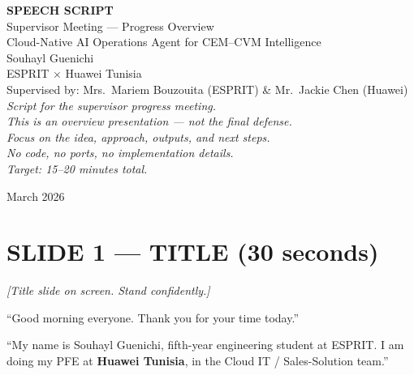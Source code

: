 \documentclass[12pt,a4paper]{article}
\newcommand{\stage}[1]{\par\textit{\color{stagedir}[#1]}\par}
\newcommand{\beat}{\par\vspace{0.4em}}
\newcommand{\emphasis}[1]{\textbf{\color{huaweired}#1}}
\begin{document}
\begin{titlepage}
    \centering
    \vspace*{3cm}

    {\Huge\bfseries\color{huaweired} SPEECH SCRIPT}\\[0.5cm]
    {\LARGE\color{aiviolet} Supervisor Meeting --- Progress Overview}\\[0.3cm]
    {\Large\color{ossblue} Cloud-Native AI Operations Agent for CEM--CVM
    Intelligence}\\[2cm]

    {\large\color{darkbg} Souhayl Guenichi}\\[0.3cm]
    {\normalsize ESPRIT $\times$ Huawei Tunisia}\\[0.3cm]
    {\normalsize Supervised by: Mrs.\ Mariem Bouzouita (ESPRIT) \& Mr.\ Jackie Chen
    (Huawei)}\\[2cm]

    \textit{\color{stagedir}Script for the supervisor progress meeting.\\
        This is an overview presentation --- not the final defense.\\
        Focus on the idea, approach, outputs, and next steps.\\
        No code, no ports, no implementation details.\\
        Target: 15--20 minutes total.}

    \vfill
    {\small March 2026}
\end{titlepage}

\tableofcontents
\newpage

\section{SLIDE 1 --- TITLE (30 seconds)}

\stage{Title slide on screen. Stand confidently.}

``Good morning everyone. Thank you for your time today.''

\beat

``My name is Souhayl Guenichi, fifth-year engineering student at ESPRIT. I am
doing my PFE at \emphasis{Huawei Tunisia}, in the Cloud IT / Sales-Solution
team.''
\end{document}
